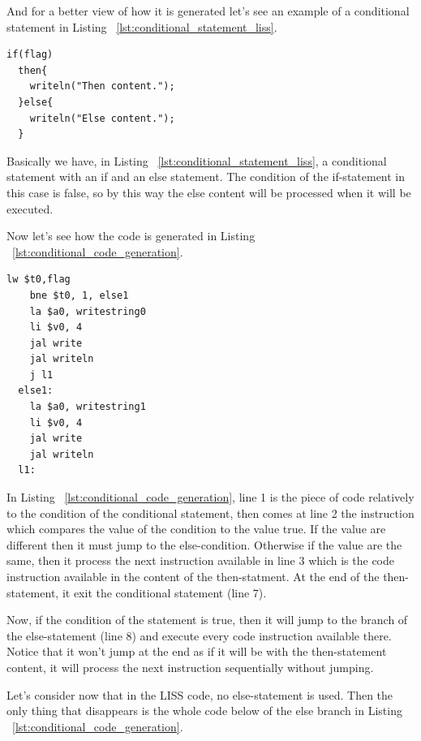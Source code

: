 \documentclass[
  oneside,
  11pt, a4paper,
  footinclude=true,
  headinclude=true,
  cleardoublepage=empty
]{scrbook}
\begin{document}
And for a better view of how it is generated let's see an example of a conditional statement in Listing ~\ref{lst:conditional_statement_liss}.

\begin{lstlisting}[caption={Example of conditional statement in LISS},label={lst:conditional_statement_liss}]
  if(flag)
  then{
    writeln("Then content.");
  }else{
    writeln("Else content.");
  }
\end{lstlisting}

Basically we have, in Listing ~\ref{lst:conditional_statement_liss}, a conditional statement with an if and an else statement. The condition of the if-statement  in this case is false, so by this way the else content will be processed when it will be executed.

Now let's see how the code is generated in Listing ~\ref{lst:conditional_code_generation}.

\begin{lstlisting}[caption={Code generated for conditional statement in MIPS},label={lst:conditional_code_generation}]
    lw $t0,flag		
    bne $t0, 1, else1		
    la $a0, writestring0
    li $v0, 4
    jal write		
    jal writeln		
    j l1		
  else1:		
    la $a0, writestring1
    li $v0, 4
    jal write		
    jal writeln		
  l1:		
\end{lstlisting}

In Listing ~\ref{lst:conditional_code_generation}, line 1 is the piece of code relatively to the condition of the conditional statement, then comes at line 2 the instruction which compares the value of the condition to the value true. If the value are different then it must jump to the else-condition. Otherwise if the value are the same, then it process the next instruction available in line 3 which is the code instruction available in the content of the then-statment. At the end of the then-statement, it exit the conditional statement (line 7).

Now, if the condition of the statement is true, then it will jump to the branch of the else-statement (line 8) and execute every code instruction available there. Notice that it won't jump at the end as if it will be with the then-statement content, it will process the next instruction sequentially without jumping.

Let's consider now that in the LISS code, no else-statement is used. Then the only thing that disappears is the whole code below of the else branch in Listing ~\ref{lst:conditional_code_generation}.
\end{document}
